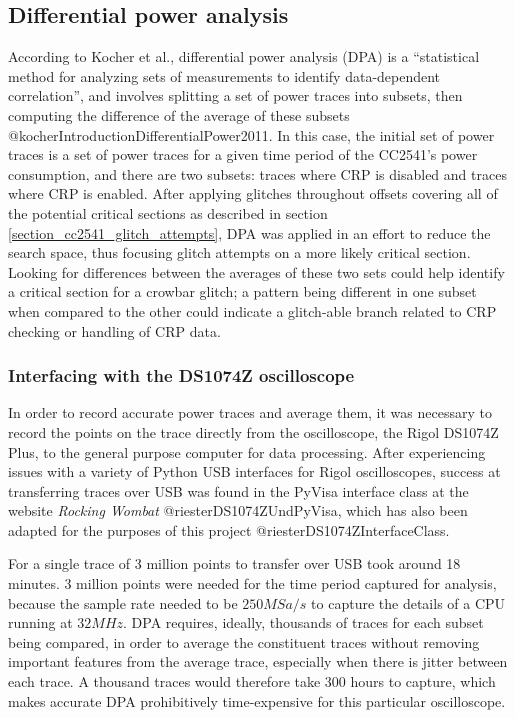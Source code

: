 \hypertarget{differential-power-analysis}{%
\subsection{\texorpdfstring{Differential power
analysis\label{section_cc2541_dpa}}{Differential power analysis}}\label{differential-power-analysis}}

According to Kocher et al., differential power analysis (DPA) is a
``statistical method for analyzing sets of measurements to identify
data-dependent correlation'', and involves splitting a set of power
traces into subsets, then computing the difference of the average of
these subsets @kocherIntroductionDifferentialPower2011. In this case,
the initial set of power traces is a set of power traces for a given
time period of the CC2541's power consumption, and there are two
subsets: traces where CRP is disabled and traces where CRP is enabled.
After applying glitches throughout offsets covering all of the potential
critical sections as described in section
\ref{section_cc2541_glitch_attempts}, DPA was applied in an effort to
reduce the search space, thus focusing glitch attempts on a more likely
critical section. Looking for differences between the averages of these
two sets could help identify a critical section for a crowbar glitch; a
pattern being different in one subset when compared to the other could
indicate a glitch-able branch related to CRP checking or handling of CRP
data.

\hypertarget{interfacing-with-the-ds1074z-oscilloscope}{%
\subsubsection{Interfacing with the DS1074Z
oscilloscope}\label{interfacing-with-the-ds1074z-oscilloscope}}

In order to record accurate power traces and average them, it was
necessary to record the points on the trace directly from the
oscilloscope, the Rigol DS1074Z Plus, to the general purpose computer
for data processing. After experiencing issues with a variety of Python
USB interfaces for Rigol oscilloscopes, success at transferring traces
over USB was found in the PyVisa interface class at the website
\emph{Rocking Wombat} @riesterDS1074ZUndPyVisa, which has also been
adapted for the purposes of this project @riesterDS1074ZInterfaceClass.

For a single trace of 3 million points to transfer over USB took around
18 minutes. 3 million points were needed for the time period captured
for analysis, because the sample rate needed to be \(250MSa/s\) to
capture the details of a CPU running at \(32MHz\). DPA requires,
ideally, thousands of traces for each subset being compared, in order to
average the constituent traces without removing important features from
the average trace, especially when there is jitter between each trace. A
thousand traces would therefore take 300 hours to capture, which makes
accurate DPA prohibitively time-expensive for this particular
oscilloscope.

